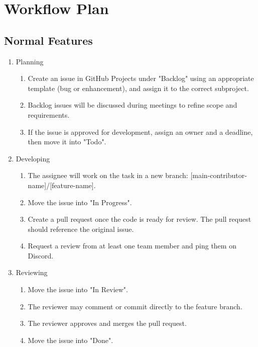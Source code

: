 \documentclass{article}
\begin{document}
\section{Workflow Plan}

\subsection{Normal Features}

\begin{enumerate}
  \item Planning
        \begin{enumerate}
          \item Create an issue in GitHub Projects under "Backlog" using an appropriate
                template (bug or enhancement), and assign it to the correct subproject.
          \item Backlog issues will be discussed during meetings to refine scope and
                requirements.
          \item If the issue is approved for development, assign an owner and a deadline, then
                move it into "Todo".
        \end{enumerate}
  \item Developing
        \begin{enumerate}
          \item The assignee will work on the task in a new branch:
                [main-contributor-name]/[feature-name].
          \item Move the issue into "In Progress".
          \item Create a pull request once the code is ready for review. The pull request
                should reference the original issue.
          \item Request a review from at least one team member and ping them on Discord.
        \end{enumerate}
  \item Reviewing
        \begin{enumerate}
          \item Move the issue into "In Review".
          \item The reviewer may comment or commit directly to the feature branch.
          \item The reviewer approves and merges the pull request.
          \item Move the issue into "Done".
        \end{enumerate}
\end{enumerate}
\end{document}
